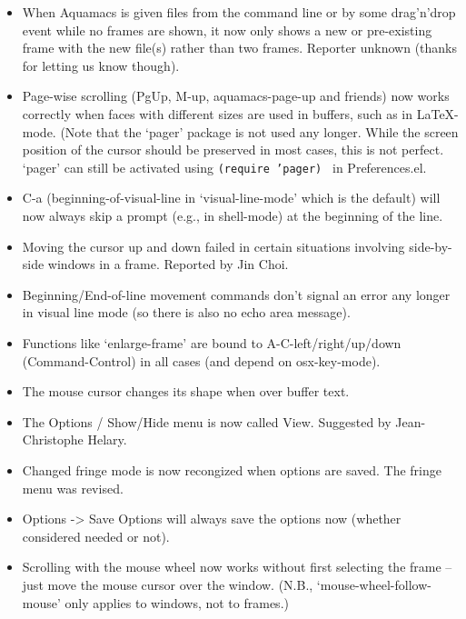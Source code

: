 \begin{itemize}
\item When Aquamacs is given files from the command line or by some drag'n'drop event while no frames are shown, it now only shows a new or pre-existing frame with the new file(s) rather than two frames.
Reporter unknown (thanks for letting us know though).

\item Page-wise scrolling (PgUp, M-up, aquamacs-page-up and friends) now works correctly when faces with different sizes are used in buffers, such as in LaTeX-mode.  (Note that the `pager' package is not used any longer.  While the screen position of the cursor should be preserved in most cases, this is not perfect.  `pager' can still be activated using {\tt (require 'pager) } in Preferences.el.

\item C-a (beginning-of-visual-line in `visual-line-mode' which is the default) will now always skip a prompt (e.g., in shell-mode) at the beginning of the line.

\item Moving the cursor up and down failed in certain situations involving side-by-side windows in a frame.
Reported by Jin Choi.

\item Beginning/End-of-line movement commands don't signal an error any longer in visual line mode (so there is also no echo area message).

\item Functions like `enlarge-frame' are bound to A-C-left/right/up/down (Command-Control) in all cases (and depend on osx-key-mode).

\item The mouse cursor changes its shape when over buffer text.

\item The Options / Show/Hide menu is now called View. 
Suggested by Jean-Christophe Helary.

\item Changed fringe mode is now recongized when options are saved.  The fringe menu was revised.

\item Options -> Save Options will always save the options now (whether considered needed or not).

\item Scrolling with the mouse wheel now works without first selecting the frame -- just move the mouse cursor over the window.  (N.B., `mouse-wheel-follow-mouse' only applies to windows, not to frames.)



\end{itemize}
